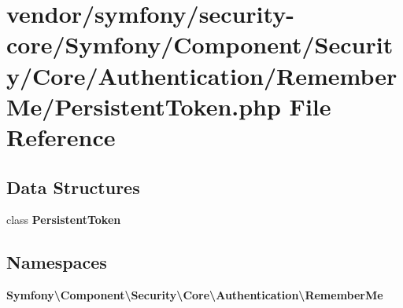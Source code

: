 \section{vendor/symfony/security-\/core/\+Symfony/\+Component/\+Security/\+Core/\+Authentication/\+Remember\+Me/\+Persistent\+Token.php File Reference}
\label{_persistent_token_8php}
\subsection*{Data Structures}
\begin{DoxyCompactItemize}
\item 
class {\bf Persistent\+Token}
\end{DoxyCompactItemize}
\subsection*{Namespaces}
\begin{DoxyCompactItemize}
\item 
 {\bf Symfony\textbackslash{}\+Component\textbackslash{}\+Security\textbackslash{}\+Core\textbackslash{}\+Authentication\textbackslash{}\+Remember\+Me}
\end{DoxyCompactItemize}
